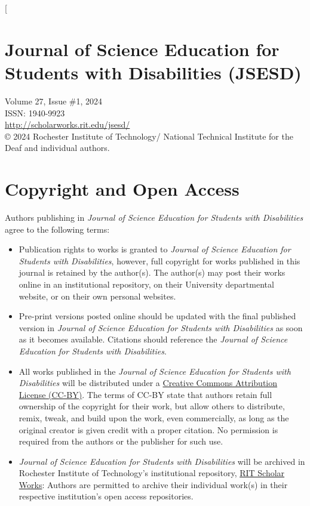 \documentclass[11.5pt]{sig-alternate}
\begin{document}
\begin{large}

\twocolumn[
\begin{@twocolumnfalse}
\section*{Journal of Science Education for Students with Disabilities (JSESD)}
 
Volume 27, Issue \#1, 2024\\ISSN: 1940-9923\\
\url{http://scholarworks.rit.edu/jsesd/}\\
© 2024 Rochester Institute of Technology/ National Technical Institute for the Deaf and
individual authors.\\

\section*{Copyright and Open Access}
Authors publishing in \textit{Journal of Science Education for Students with Disabilities} agree to the following terms:
\begin{itemize}
    \item Publication rights to works is granted to \textit{Journal of Science Education for Students with Disabilities}, however, full copyright for works published in this journal is retained by the author(s). The author(s) may post their works online in an institutional repository, on their University departmental website, or on their own personal websites.
    \item Pre-print versions posted online should be updated with the final published version in \textit{Journal of Science Education for Students with Disabilities} as soon as it becomes available. Citations should reference the \textit{Journal of Science Education for Students with Disabilities}.
    \item All works published in the \textit{Journal of Science Education for Students with Disabilities} will be distributed under a \href{http://creativecommons.org/licenses/by/3.0/}{Creative Commons Attribution License (CC-BY)}. The terms of CC-BY state that authors retain full ownership of the copyright for their work, but allow others to distribute, remix, tweak, and build upon the work, even commercially, as long as the original creator is given credit with a proper citation. No permission is required from the authors or the publisher for such use.
    \item \textit{Journal of Science Education for Students with Disabilities} will be archived in Rochester Institute of Technology's institutional repository, \href{https://scholarworks.rit.edu/}{RIT Scholar Works}: Authors are permitted to archive their individual work(s) in their respective institution's open access repositories.
\end{itemize}


\end{@twocolumnfalse}
\end{large}
\end{document}
